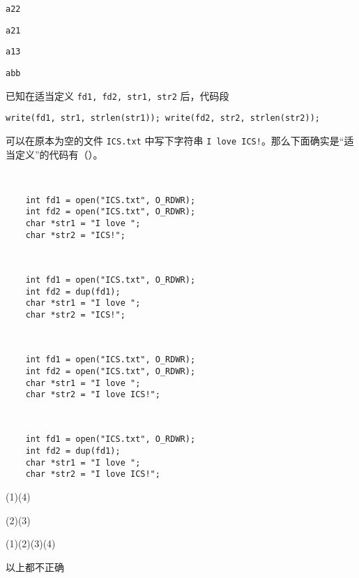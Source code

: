 \begin{problems}
\begin{choices}
            \item \verb|a22|
            \item \verb|a21|
            \item \verb|a13|
            \item \verb|abb|
        \end{choices}
         已知在适当定义 \verb|fd1, fd2, str1, str2| 后，代码段
        \begin{center}
            \verb|write(fd1, str1, strlen(str1)); write(fd2, str2, strlen(str2));|
        \end{center}
        可以在原本为空的文件 \verb|ICS.txt| 中写下字符串 \verb|I love ICS!|。那么下面确实是“适当定义”的代码有（\qquad）。
        \vspace{.25em}
        \begin{compactenum}[(1)]
            \item\ \begin{verbatim}
    int fd1 = open("ICS.txt", O_RDWR);
    int fd2 = open("ICS.txt", O_RDWR);
    char *str1 = "I love ";
    char *str2 = "ICS!";
            \end{verbatim}
            \item\ \begin{verbatim}
    int fd1 = open("ICS.txt", O_RDWR);
    int fd2 = dup(fd1);
    char *str1 = "I love ";
    char *str2 = "ICS!";
            \end{verbatim}
            \item\ \begin{verbatim}
    int fd1 = open("ICS.txt", O_RDWR);
    int fd2 = open("ICS.txt", O_RDWR);
    char *str1 = "I love ";
    char *str2 = "I love ICS!";
            \end{verbatim}
            \item\ \begin{verbatim}
    int fd1 = open("ICS.txt", O_RDWR);
    int fd2 = dup(fd1);
    char *str1 = "I love ";
    char *str2 = "I love ICS!";
            \end{verbatim}
        \end{compactenum}
        \begin{choices}
            \item (1)(4)
            \item (2)(3)
            \item (1)(2)(3)(4)
            \item 以上都不正确

\end{choices}
\end{problems}
